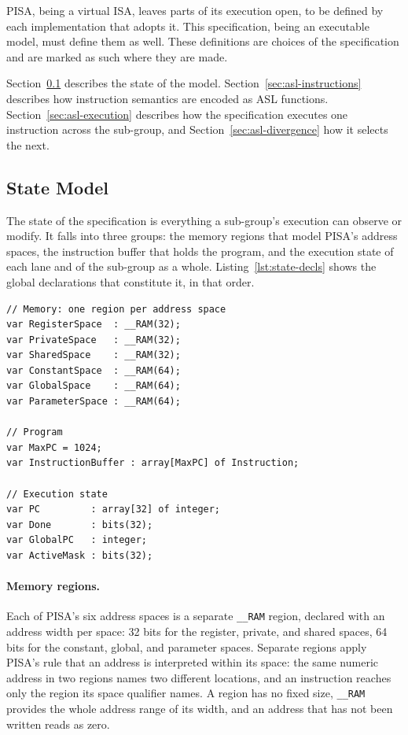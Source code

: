 PISA, being a virtual ISA, leaves parts of its execution open, to be
defined by each implementation that adopts it. This specification, being
an executable model, must define them as well. These definitions are
choices of the specification and are marked as such where they are made.

Section~\ref{sec:asl-state} describes the state of the model.
Section~\ref{sec:asl-instructions} describes how instruction semantics are
encoded as ASL functions. Section~\ref{sec:asl-execution} describes how
the specification executes one instruction across the sub-group, and
Section~\ref{sec:asl-divergence} how it selects the next.

\subsection{State Model}
\label{sec:asl-state}

The state of the specification is everything a sub-group's execution can
observe or modify. It falls into three groups: the memory regions that
model PISA's address spaces, the instruction buffer that holds the
program, and the execution state of each lane and of the sub-group as a
whole. Listing~\ref{lst:state-decls} shows the global declarations that
constitute it, in that order.

\begin{lstlisting}[caption={The specification's state declarations.}, label={lst:state-decls}]
// Memory: one region per address space
var RegisterSpace  : __RAM(32);
var PrivateSpace   : __RAM(32);
var SharedSpace    : __RAM(32);
var ConstantSpace  : __RAM(64);
var GlobalSpace    : __RAM(64);
var ParameterSpace : __RAM(64);

// Program
var MaxPC = 1024;
var InstructionBuffer : array[MaxPC] of Instruction;

// Execution state
var PC         : array[32] of integer;
var Done       : bits(32);
var GlobalPC   : integer;
var ActiveMask : bits(32);
\end{lstlisting}

\paragraph{Memory regions.} Each of PISA's six address spaces is a
separate \lstinline{__RAM} region, declared with an address width per
space: 32 bits for the register, private, and shared spaces, 64 bits for
the constant, global, and parameter spaces.
Separate regions apply PISA's rule that an address is interpreted within
its space: the same numeric address in two regions names two different
locations, and an instruction reaches only the region its space qualifier
names. A region has no fixed size, \lstinline{__RAM} provides the whole
address range of its width, and an address that has not been written
reads as zero.


